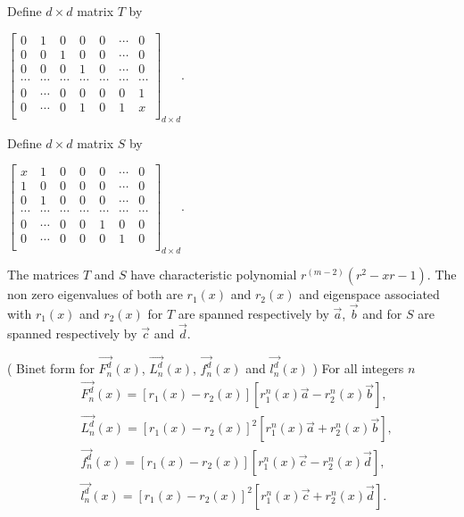    \begin{definition} Define $d \times d$ matrix $T$ by
 \begin{center}
 $ \begin{bmatrix}
 0 & 1 & 0 & 0 & 0 & \cdots & 0 \\ 
  0 & 0 & 1 & 0 & 0 & \cdots & 0 \\ 
  0 & 0 & 0 & 1 & 0 & \cdots & 0 \\ 
 \cdots & \cdots & \cdots & \cdots & \cdots & \cdots & \cdots \\ 
 0 & \cdots & 0 & 0 & 0 & 0 & 1 \\ 
  0 & \cdots & 0 & 1 & 0 & 1 & x\\ 
 \end{bmatrix}_{d \times d}$.
 \end{center} 
  \end{definition}
  \begin{definition} Define $d \times d$ matrix $S$ by
 \begin{center}
 $ \begin{bmatrix}
 x & 1 & 0 & 0 & 0 & \cdots & 0 \\ 
  1 & 0 & 0 & 0 & 0 & \cdots & 0 \\ 
  0 & 1 & 0 & 0 & 0 & \cdots & 0 \\ 
 \cdots & \cdots & \cdots & \cdots & \cdots & \cdots & \cdots \\ 
 0 & \cdots & 0 & 0 & 1 & 0 & 0 \\ 
  0 & \cdots & 0 & 0 & 0 & 1 & 0\\ 
 \end{bmatrix}_{d \times d}$.
 \end{center} 
  \end{definition}
  \noindent The matrices $T$ and $S$ have characteristic polynomial $r^{(m-2)}(r^2 - xr - 1)$. The non
zero eigenvalues of both are $r_1(x)$ and $r_2(x)$ and eigenspace associated with $r_1(x)$ and $r_2(x)$ for $T$ are spanned
respectively by $ \stackrel{\rightarrow}{a}$, $ \stackrel{\rightarrow}{b}$ and for $S$ are spanned respectively by $ \stackrel{\rightarrow}{c}$ and $ \stackrel{\rightarrow}{d}$.
\begin{theorem}({ Binet form for $\stackrel{\rightarrow}{F_{n}^d}(x)$, $\stackrel{\rightarrow}{L_{n}^d}(x)$, $\stackrel{\rightarrow}{f_{n}^d}(x)$ and $\stackrel{\rightarrow}{l_{n}^d}(x)$ })
For all integers $n$
  \begin{align*}
  &\stackrel{\rightarrow}{F_{n}^d}(x) = [r_1(x) - r_2(x)][r_1^n(x) \stackrel{\rightarrow}{a}  - r_2^n(x) \stackrel{\rightarrow}{b}], \\
  &\stackrel{\rightarrow}{L_{n}^d}(x) = [r_1(x) - r_2(x)]^2[r_1^n(x) \stackrel{\rightarrow}{a}  + r_2^n(x) \stackrel{\rightarrow}{b}], \\
  &\stackrel{\rightarrow}{f_{n}^d}(x) = [r_1(x) - r_2(x)][r_1^n(x) \stackrel{\rightarrow}{c}  - r_2^n(x) \stackrel{\rightarrow}{d}],\\ 
 & \stackrel{\rightarrow}{l_{n}^d}(x) = [r_1(x) - r_2(x)]^2[r_1^n(x) \stackrel{\rightarrow}{c}  + r_2^n(x) \stackrel{\rightarrow}{d}].
 \end{align*}
 \end{theorem} 
